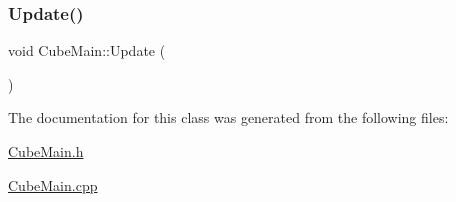 \subsubsection{\texorpdfstring{Update()}{Update()}}
{\footnotesize\ttfamily void Cube\+Main\+::\+Update (\begin{DoxyParamCaption}{ }\end{DoxyParamCaption})}



The documentation for this class was generated from the following files\+:\begin{DoxyCompactItemize}
\item 
\hyperlink{_cube_main_8h}{Cube\+Main.\+h}\item 
\hyperlink{_cube_main_8cpp}{Cube\+Main.\+cpp}\end{DoxyCompactItemize}
